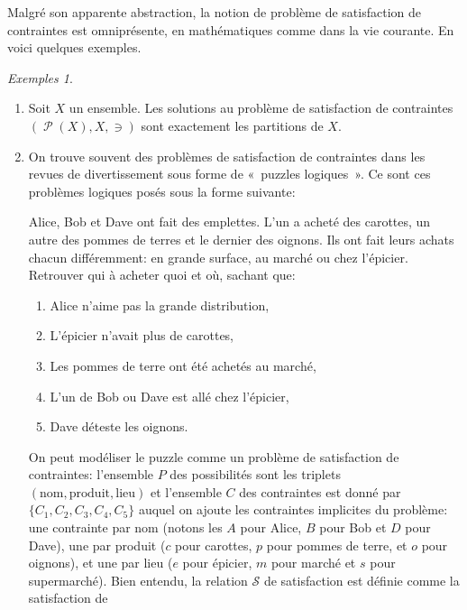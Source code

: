 \documentclass[french,a4paper]{article}
\theoremstyle{definition}
\theoremstyle{remark}
\newtheorem*{examples}{Exemples}
\DeclareMathOperator{\powersetoperator}{\mathcal P}
\newcommand{\powerset}[1]{\powersetoperator(#1)}
\begin{document}
Malgré son apparente abstraction, la notion de problème de
satisfaction de contraintes est omniprésente, en mathématiques comme
dans la vie courante. En voici quelques exemples.
\begin{examples}~
  \begin{enumerate}[label=(\arabic*)]
  \item Soit $X$ un ensemble. Les solutions au problème de
    satisfaction de contraintes $(\powerset X, X, \ni)$ sont
    exactement les partitions de $X$.
  \item On trouve souvent des problèmes de satisfaction de contraintes
    dans les revues de divertissement sous forme de «~puzzles
    logiques~». Ce sont ces problèmes logiques posés sous la forme
    suivante:
    \begin{center}
      \begin{minipage}{0.8\linewidth}
        Alice, Bob et Dave ont fait des emplettes. L'un a acheté des
        carottes, un autre des pommes de terres et le dernier des
        oignons. Ils ont fait leurs achats chacun différemment: en
        grande surface, au marché ou chez l'épicier. Retrouver qui à
        acheter quoi et où, sachant que:
        \begin{enumerate}[label=($C_{\arabic*}$)]
        \item Alice n'aime pas la grande distribution,
        \item L'épicier n'avait plus de carottes,
        \item Les pommes de terre ont été achetés au marché,
        \item L'un de Bob ou Dave est allé chez l'épicier,
        \item Dave déteste les oignons.
        \end{enumerate}
      \end{minipage}
    \end{center}
    On peut modéliser le puzzle comme un problème de satisfaction de
    contraintes: l'ensemble $P$ des possibilités sont les triplets
    $(\mathrm{nom},\mathrm{produit},\mathrm{lieu})$ et l'ensemble $C$
    des contraintes est donné par $\{C_1,C_2,C_3,C_4,C_5\}$ auquel on
    ajoute les contraintes implicites du problème: une contrainte par
    nom (notons les $A$ pour Alice, $B$ pour Bob et $D$ pour Dave),
    une par produit ($c$ pour carottes, $p$ pour pommes de terre, et
    $o$ pour oignons), et une par lieu ($e$ pour épicier, $m$ pour
    marché et $s$ pour supermarché). Bien entendu, la relation
    $\mathcal S$ de satisfaction est définie comme la satisfaction de

\end{enumerate}
\end{examples}
\end{document}
